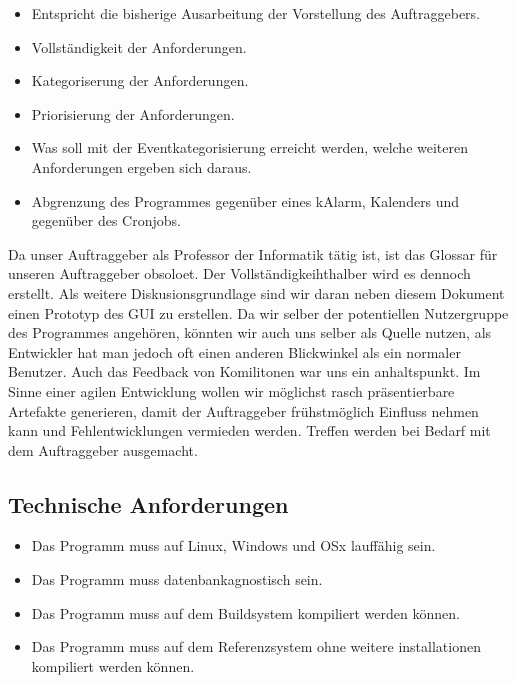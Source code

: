 \documentclass[11pt,titelpage]{scrartcl}
\begin{document}
\begin{itemize}
\item Entspricht die bisherige Ausarbeitung der Vorstellung des Auftraggebers.
\item Vollständigkeit der Anforderungen.
\item Kategoriserung der Anforderungen.
\item Priorisierung der Anforderungen.
\item Was soll mit der Eventkategorisierung erreicht werden, welche weiteren Anforderungen ergeben sich daraus.
\item Abgrenzung des Programmes gegenüber eines kAlarm, Kalenders und gegenüber des Cronjobs.
\end{itemize}
Da unser Auftraggeber als Professor der Informatik tätig ist, ist das Glossar für unseren Auftraggeber obsoloet. Der Vollständigkeihthalber wird es dennoch erstellt. 
Als weitere Diskusionsgrundlage sind wir daran neben diesem Dokument einen Prototyp des GUI zu erstellen.
Da wir selber der potentiellen Nutzergruppe des Programmes angehören, könnten wir auch uns selber als Quelle nutzen, als Entwickler hat man jedoch oft einen anderen Blickwinkel als ein normaler Benutzer.
Auch das Feedback von Komilitonen war uns ein anhaltspunkt.
Im Sinne einer agilen Entwicklung wollen wir möglichst rasch präsentierbare Artefakte generieren, damit der Auftraggeber frühstmöglich Einfluss nehmen kann und Fehlentwicklungen vermieden werden. Treffen werden bei Bedarf mit dem Auftraggeber ausgemacht.


\subsection{Technische Anforderungen}

\begin{itemize}
 \item Das Programm muss auf Linux, Windows und OSx lauffähig sein.
 \item Das Programm muss datenbankagnostisch sein.
 \item Das Programm muss auf dem Buildsystem kompiliert werden können.
 \item Das Programm muss auf dem Referenzsystem ohne weitere installationen kompiliert werden können.
\end{itemize}
\end{document}

